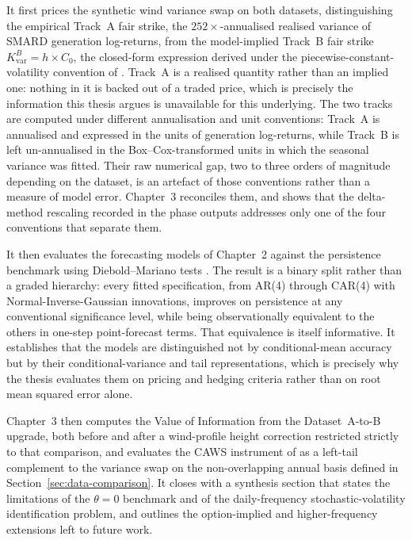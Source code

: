 ﻿\documentclass[11pt, a4paper, twoside]{article}
\begin{document}
It first prices the synthetic wind variance swap on both datasets, distinguishing the empirical Track~A fair strike, the $252\times$-annualised realised variance of SMARD generation log-returns, from the model-implied Track~B fair strike $K_{\text{var}}^B = h \times C_0$, the closed-form expression derived under the piecewise-constant-volatility convention of \citet{Tol1997}. Track~A is a realised quantity rather than an implied one: nothing in it is backed out of a traded price, which is precisely the information this thesis argues is unavailable for this underlying. The two tracks are computed under different annualisation and unit conventions: Track~A is annualised and expressed in the units of generation log-returns, while Track~B is left un-annualised in the Box--Cox-transformed units in which the seasonal variance was fitted. Their raw numerical gap, two to three orders of magnitude depending on the dataset, is an artefact of those conventions rather than a measure of model error. Chapter~3 reconciles them, and shows that the delta-method rescaling recorded in the phase outputs addresses only one of the four conventions that separate them.

It then evaluates the forecasting models of Chapter~2 against the persistence benchmark using Diebold--Mariano tests \citep{DieboldMariano1995, HarveyEtAl1997}. The result is a binary split rather than a graded hierarchy: every fitted specification, from AR(4) through CAR(4) with Normal-Inverse-Gaussian innovations, improves on persistence at any conventional significance level, while being observationally equivalent to the others in one-step point-forecast terms. That equivalence is itself informative. It establishes that the models are distinguished not by conditional-mean accuracy but by their conditional-variance and tail representations, which is precisely why the thesis evaluates them on pricing and hedging criteria rather than on root mean squared error alone.

Chapter~3 then computes the Value of Information from the Dataset~A-to-B upgrade, both before and after a wind-profile height correction restricted strictly to that comparison, and evaluates the CAWS instrument of \citet{AlexandridisZapranis2013} as a left-tail complement to the variance swap on the non-overlapping annual basis defined in Section~\ref{sec:data-comparison}. It closes with a synthesis section that states the limitations of the $\theta = 0$ benchmark and of the daily-frequency stochastic-volatility identification problem, and outlines the option-implied and higher-frequency extensions left to future work.

\newpage

\end{document}
